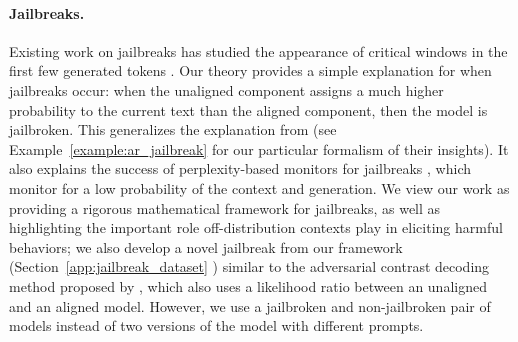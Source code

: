 \paragraph{Jailbreaks.} Existing work on jailbreaks has studied the appearance of critical windows in the first few generated tokens \citep{qi2024safetyalignmentjusttokens,zhang2024dissecting,he2024safedataidentifyingbenign,lin2023unlockingspellbasellms}. Our theory provides a simple explanation for when jailbreaks occur: when the unaligned component assigns a much higher probability to the current text than the aligned component, then the model is jailbroken. This generalizes the explanation from \cite{qi2024safetyalignmentjusttokens} (see Example~\ref{example:ar_jailbreak} for our particular formalism of their insights). It also explains the success of perplexity-based monitors for jailbreaks \citep{alon2023detectinglanguagemodelattacks}, which monitor for a low probability of the context and generation. We view our work as providing a rigorous mathematical framework for jailbreaks, as well as highlighting the important role off-distribution contexts play in eliciting harmful behaviors; we also develop a novel jailbreak from our framework (Section~\ref{app:jailbreak_dataset}
) similar to the adversarial contrast decoding method proposed by \citep{zhao2024adversarialcontrastivedecodingboosting}, which also uses a likelihood ratio between an unaligned and an aligned model. However, we use a jailbroken and non-jailbroken pair of models instead of two versions of the model with different prompts. 


